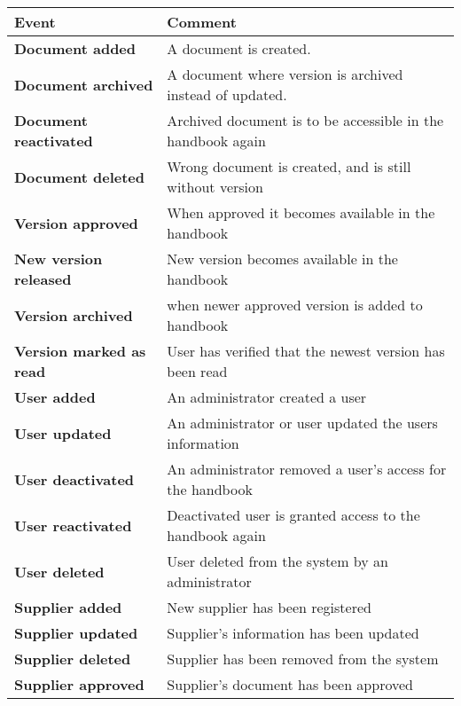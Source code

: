 \begin{table}[H]
	\begin{tabular}{m{} l}
		\hline
		Event & Comment\\
		\hline
		\textbf{Document added} & A document is created.\\
		\textbf{Document archived} & A document where version is archived instead of updated.\\
		\textbf{Document reactivated} & Archived document is to be accessible in the handbook again\\
		\textbf{Document deleted} & Wrong document is created, and is still without version\\
		\textbf{Version approved}  & When approved it becomes available in the handbook\\ 
		\textbf{New version released} &  New version becomes available in the handbook\\
		\textbf{Version archived} & when newer approved version is added to handbook\\
		\textbf{Version marked \newline as read} & User has verified that the newest version has been read\\
		\textbf{User added} & An administrator created a user\\
		\textbf{User updated} & An administrator or user updated the users information\\
		\textbf{User deactivated} & An administrator removed a user's access for the handbook\\
		\textbf{User reactivated} & Deactivated user is granted access to the handbook again\\
		\textbf{User deleted} & User deleted from the system by an administrator\\
		\textbf{Supplier added} & New supplier has been registered\\
		\textbf{Supplier updated} & Supplier's information has been updated\\
		\textbf{Supplier deleted} & Supplier has been removed from the system\\
		\textbf{Supplier approved} & Supplier's document has been approved\\

\end{tabular}
\end{table}
